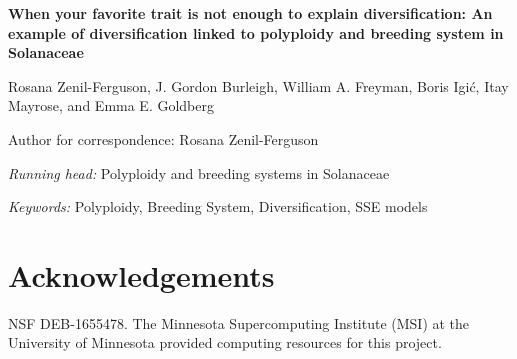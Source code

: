 \documentclass[11pt]{article}
\begin{document}

\begin{center}
    \textbf{When your favorite trait is not enough to explain diversification: An example of diversification linked to polyploidy and breeding system in Solanaceae}
\end{center}

\vfill

\noindent
Rosana Zenil-Ferguson,%
%
\noindent
J. Gordon Burleigh,%
%
\noindent
William A. Freyman,%
%
\noindent
Boris Igi\'c,%
%
\noindent
Itay Mayrose,%
%
and
Emma E. Goldberg%

\vfill

\theendnotes

\noindent
Author for correspondence: Rosana Zenil-Ferguson

\vfill

\noindent
\textit{Running head:} Polyploidy and breeding systems in Solanaceae

\vfill

\noindent
\textit{Keywords:} 
Polyploidy,
Breeding System,
Diversification, SSE models

\vfill

\linenumbers


\clearpage



\clearpage





\section{Acknowledgements}

NSF DEB-1655478.
The Minnesota Supercomputing Institute (MSI) at the University of Minnesota provided computing resources for this project.


\clearpage


\setstretch{\stretchby}
\end{document}
